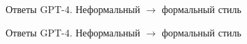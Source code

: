 \begin{figure}[ht]
  \centering
  \caption{Ответы GPT-4. Неформальный $\rightarrow$ формальный стиль}
  \label{fig:gpt_wiki2lurk_answers1}
\end{figure}

\begin{figure}[ht]
  \centering
  \caption{Ответы GPT-4. Неформальный $\rightarrow$ формальный стиль}
  \label{fig:gpt_wiki2lurk_answers2}
\end{figure}